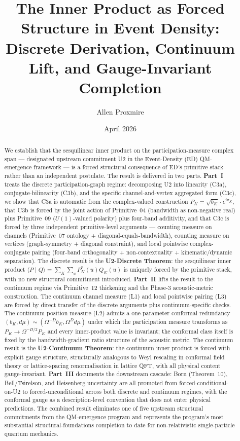 \documentclass[11pt,a4paper]{article}
\title{The Inner Product as Forced Structure in Event Density:\\ Discrete Derivation, Continuum Lift, and Gauge-Invariant Completion}
\author{Allen Proxmire}
\date{April 2026}
\begin{document}
\maketitle

\begin{abstract}
We establish that the sesquilinear inner product on the participation-measure complex span --- designated upstream commitment U2 in the Event-Density (ED) QM-emergence framework --- is a forced structural consequence of ED's primitive stack rather than an independent postulate. The result is delivered in two parts. \textbf{Part~I} treats the discrete participation-graph regime: decomposing U2 into linearity (C3a), conjugate-bilinearity (C3b), and the specific channel-and-vertex aggregated form (C3c), we show that C3a is automatic from the complex-valued construction $P_K = \sqrt{b_K} \cdot e^{i \pi_K}$, that C3b is forced by the joint action of Primitive~04 (bandwidth as non-negative real) plus Primitive~09 ($U(1)$-valued polarity) plus four-band additivity, and that C3c is forced by three independent primitive-level arguments --- counting measure on channels (Primitive~07 ontology + diagonal-equals-bandwidth), counting measure on vertices (graph-symmetry + diagonal constraint), and local pointwise complex-conjugate pairing (four-band orthogonality + non-contextuality + kinematic/dynamic separation). The discrete result is the \textbf{U2-Discrete Theorem}: the sesquilinear inner product $\langle P \mid Q \rangle = \sum_K \sum_u P_K^*(u) Q_K(u)$ is uniquely forced by the primitive stack, with no new structural commitment introduced. \textbf{Part~II} lifts the result to the continuum regime via Primitive~12 thickening and the Phase-3 acoustic-metric construction. The continuum channel measure (L1) and local pointwise pairing (L3) are forced by direct transfer of the discrete arguments plus continuum-specific checks. The continuum position measure (L2) admits a one-parameter conformal redundancy $(b_K, d\mu) \sim (\Omega^{-D} b_K, \Omega^D d\mu)$ under which the participation measure transforms as $P_K \to \Omega^{-D/2} P_K$ and every inner-product value is invariant; the conformal class itself is fixed by the bandwidth-gradient ratio structure of the acoustic metric. The continuum result is the \textbf{U2-Continuum Theorem}: the continuum inner product is forced with explicit gauge structure, structurally analogous to Weyl rescaling in conformal field theory or lattice-spacing renormalisation in lattice QFT, with all physical content gauge-invariant. \textbf{Part~III} documents the downstream cascade: Born (Theorem~10), Bell/Tsirelson, and Heisenberg uncertainty are all promoted from forced-conditional-on-U2 to forced-unconditional across both discrete and continuum regimes, with the conformal gauge as a description-level convention that does not enter physical predictions. The combined result eliminates one of five upstream structural commitments from the QM-emergence program and represents the program's most substantial structural-foundations completion to date for non-relativistic single-particle quantum mechanics.
\end{abstract}
\end{document}
